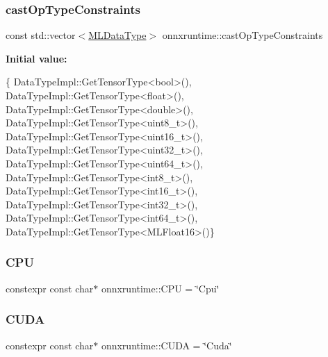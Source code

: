 \subsubsection{\texorpdfstring{cast\+Op\+Type\+Constraints}{castOpTypeConstraints}}
{\footnotesize\ttfamily const std\+::vector$<$\mbox{\hyperlink{namespaceonnxruntime_ad77d0a6e838ec7da5dc35fed5ee66b49}{M\+L\+Data\+Type}}$>$ onnxruntime\+::cast\+Op\+Type\+Constraints}

{\bfseries Initial value\+:}
\begin{DoxyCode}
\{
    DataTypeImpl::GetTensorType<bool>(),
    DataTypeImpl::GetTensorType<float>(),
    DataTypeImpl::GetTensorType<double>(),
    DataTypeImpl::GetTensorType<uint8\_t>(),
    DataTypeImpl::GetTensorType<uint16\_t>(),
    DataTypeImpl::GetTensorType<uint32\_t>(),
    DataTypeImpl::GetTensorType<uint64\_t>(),
    DataTypeImpl::GetTensorType<int8\_t>(),
    DataTypeImpl::GetTensorType<int16\_t>(),
    DataTypeImpl::GetTensorType<int32\_t>(),
    DataTypeImpl::GetTensorType<int64\_t>(),
    DataTypeImpl::GetTensorType<MLFloat16>()\}
\end{DoxyCode}
\mbox{\label{namespaceonnxruntime_ac6ee3a867a193f66e22c8ae8763d5924}} 
\subsubsection{\texorpdfstring{C\+PU}{CPU}}
{\footnotesize\ttfamily constexpr const char$\ast$ onnxruntime\+::\+C\+PU = \char`\"{}Cpu\char`\"{}}

\mbox{\label{namespaceonnxruntime_ae3f1c8a44631eb0dd833092f8ec6c750}} 
\subsubsection{\texorpdfstring{C\+U\+DA}{CUDA}}
{\footnotesize\ttfamily constexpr const char$\ast$ onnxruntime\+::\+C\+U\+DA = \char`\"{}Cuda\char`\"{}}

\mbox{\label{namespaceonnxruntime_a50613d3dd1ffbf9871c50182a768aad1}} 
